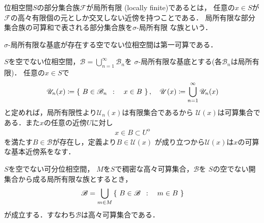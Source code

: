 	\begin{screen}
		\begin{dfn}[局所有限]
			位相空間$S$の部分集合族$\mathscr{F}$が局所有限
			(locally finite)であるとは，
			任意の$x \in S$が$\mathscr{F}$の高々有限個の元としか交叉しない近傍を持つことである．
			局所有限な部分集合族の可算和で表される部分集合族を$\sigma$-局所有限
			な族という．
		\end{dfn}
	\end{screen}
	
	\begin{screen}
		\begin{thm}
			$\sigma$-局所有限な基底が存在する空でない位相空間は第一可算である．
		\end{thm}
	\end{screen}
	
	\begin{prf}
		$S$を空でない位相空間，$\mathscr{B} = \bigcup_{n=1}^\infty \mathscr{B}_n$を
		$\sigma$-局所有限な基底とする(各$\mathscr{B}_n$は局所有限)．
		任意の$x \in S$で
		\begin{align}
			\mathscr{U}_n(x) \coloneqq \left\{\ B \in \mathscr{B}_n\ \, : \quad x \in B\ \right\},
			\quad \mathscr{U}(x) \coloneqq \bigcup_{n=1}^\infty \mathscr{U}_n(x)
		\end{align}
		と定めれば，局所有限性より$\mathscr{U}_n(x)$は有限集合であるから
		$\mathscr{U}(x)$は可算集合である．また$x$の任意の近傍$U$に対し
		\begin{align}
			x \in B \subset U^{\mathrm{o}}
		\end{align}
		を満たす$B \in \mathscr{B}$が存在し，定義より$B \in \mathscr{U}(x)$
		が成り立つから$\mathscr{U}(x)$は$x$の可算な基本近傍系をなす．
		\QED
	\end{prf}
	
	\begin{screen}
		\begin{thm}[可分空間の局所有限な開集合族は高々有限集合]
		\label{thm:locally_finite_family_of_open_sets_is_countable_in_separable_space}
			$S$を空でない可分位相空間，
			$M$を$S$で稠密な高々可算集合，$\mathscr{B}$を
			$S$の空でない開集合から成る局所有限な族とするとき，
			\begin{align}
				\mathscr{B} = \bigcup_{m \in M} \left\{\ B \in \mathscr{B}\ \, : \quad m \in B\ \right\}
			\end{align}
			が成立する．すなわち$\mathscr{B}$は高々可算集合である．
		\end{thm}
	\end{screen}
	
